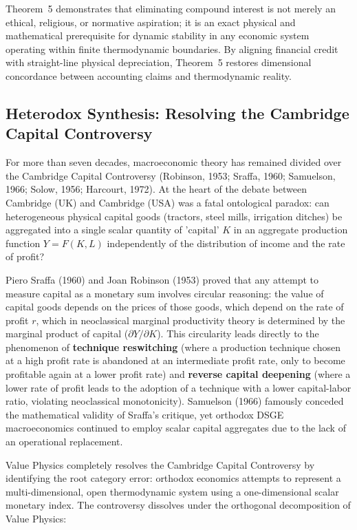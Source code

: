 \documentclass[preprint,12pt,authoryear]{elsarticle}
\theoremstyle{definition}
\begin{document}
Theorem~5 demonstrates that eliminating compound interest is not merely an ethical, religious, or normative aspiration; it is an exact physical and mathematical prerequisite for dynamic stability in any economic system operating within finite thermodynamic boundaries. By aligning financial credit with straight-line physical depreciation, Theorem~5 restores dimensional concordance between accounting claims and thermodynamic reality.


\subsection{Heterodox Synthesis: Resolving the Cambridge Capital Controversy}

For more than seven decades, macroeconomic theory has remained divided over the Cambridge Capital Controversy (Robinson, 1953; Sraffa, 1960; Samuelson, 1966; Solow, 1956; Harcourt, 1972). At the heart of the debate between Cambridge (UK) and Cambridge (USA) was a fatal ontological paradox: can heterogeneous physical capital goods (tractors, steel mills, irrigation ditches) be aggregated into a single scalar quantity of 'capital' $K$ in an aggregate production function $Y = F(K, L)$ independently of the distribution of income and the rate of profit?

Piero Sraffa (1960) and Joan Robinson (1953) proved that any attempt to measure capital as a monetary sum involves circular reasoning: the value of capital goods depends on the prices of those goods, which depend on the rate of profit $r$, which in neoclassical marginal productivity theory is determined by the marginal product of capital ($\partial Y / \partial K$). This circularity leads directly to the phenomenon of \textbf{technique reswitching} (where a production technique chosen at a high profit rate is abandoned at an intermediate profit rate, only to become profitable again at a lower profit rate) and \textbf{reverse capital deepening} (where a lower rate of profit leads to the adoption of a technique with a lower capital-labor ratio, violating neoclassical monotonicity). Samuelson (1966) famously conceded the mathematical validity of Sraffa's critique, yet orthodox DSGE macroeconomics continued to employ scalar capital aggregates due to the lack of an operational replacement.

Value Physics completely resolves the Cambridge Capital Controversy by identifying the root category error: orthodox economics attempts to represent a multi-dimensional, open thermodynamic system using a one-dimensional scalar monetary index. The controversy dissolves under the orthogonal decomposition of Value Physics:
\end{document}
